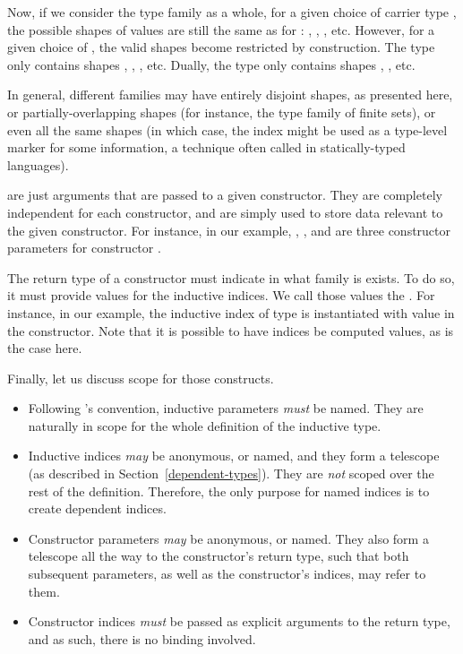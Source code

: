 Now, if we consider the type family  as a whole, for
a given choice of carrier type , the possible shapes of values are
still the same as for : \coqinline{[]}, ,
, etc.  However, for a given choice of , the
valid shapes become restricted by construction.  The type  only contains shapes \coqinline{[]}, ,
, etc.  Dually, the type  only contains shapes , , etc.

In general, different families may have entirely disjoint shapes, as presented
here, or partially-overlapping shapes (for instance, the type family of finite
sets), or even all the same shapes (in which case, the index might be used as a
type-level marker for some information, a technique often called  in statically-typed languages).

 are just arguments that are passed to a given
constructor.  They are completely independent for each constructor, and are
simply used to store data relevant to the given constructor.  For instance, in
our  example, , , and
 are three constructor parameters for constructor .

The return type of a constructor must indicate in what family is exists.  To do
so, it must provide values for the inductive indices.  We call those values the
.  For instance, in our 
example, the inductive index of type  is instantiated with
value  in the  constructor.  Note that
it is possible to have indices be computed values, as is the case here.

Finally, let us discuss scope for those constructs.

\begin{itemize}

\item Following \Coq{}'s convention, inductive parameters \emph{must} be named.
They are naturally in scope for the whole definition of the inductive type.

\item Inductive indices \emph{may} be anonymous, or named, and they form a
telescope (as described in Section~\ref{dependent-types}).  They are \emph{not}
scoped over the rest of the definition.  Therefore, the only purpose for named
indices is to create dependent indices.

\item Constructor parameters \emph{may} be anonymous, or named.  They also form
a telescope all the way to the constructor's return type, such that both
subsequent parameters, as well as the constructor's indices, may refer to them.

\item Constructor indices \emph{must} be passed as explicit arguments to the
return type, and as such, there is no binding involved.

\end{itemize}
